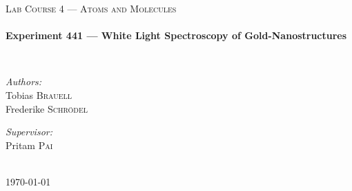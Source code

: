 \begin{titlepage}
\begin{center}
    \textsc{\Large Lab Course 4 --- Atoms and Molecules}\\[0.5 cm]

    \HRule \\[0.4 cm]
    { \huge \bfseries Experiment 441 --- White Light Spectroscopy of
    Gold-Nanostructures \\[0.4 cm] }

    \HRule \\[1.5 cm]

    \noindent
    \begin{minipage}{0.4\textwidth}
      \begin{flushleft} \large
	\emph{Authors:}\\
	Tobias \textsc{Brauell}\\
	Frederike \textsc{Schrödel}
      \end{flushleft}
    \end{minipage}%
    \begin{minipage}{0.4\textwidth}
      \begin{flushright} \large
	\emph{Supervisor:} \\
	Pritam \textsc{Pai}
      \end{flushright}
    \end{minipage}

    \vfill

    \HRule \\[0.4 cm]
    {\large \today}

  \end{center}
\end{titlepage}